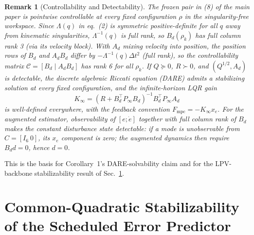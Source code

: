 \documentclass[journal]{IEEEtran}
\newtheorem{remark}{Remark}
\newcommand{\Laminv}{\Lambda^{-1}(q)}
\newcommand{\Fmpc}{F_{\text{mpc}}}
\begin{document}
\begin{remark}[Controllability and Detectability]\label{rem:feasibility}
The frozen pair in (8) of the main paper is pointwise controllable at every
fixed configuration $\rho$ in the singularity-free workspace. Since
$\Lambda(q)$ in eq.~(2) is symmetric positive-definite for all $q$ away
from kinematic singularities, $\Laminv$ is full rank, so $B_d(\rho_k)$
has full column rank 3 (via its velocity block). With $A_d$ mixing
velocity into position, the position rows of $B_d$ and $A_dB_d$ differ
by $-\Laminv\Delta t^2$ (full rank), so the controllability matrix
$\mathcal C=[B_d\mid A_dB_d]$ has rank 6 for all $\rho_k$. If
$Q\succeq0$, $R\succ0$, and $(Q^{1/2},A_d)$ is detectable, the discrete
algebraic Riccati equation (DARE) admits a stabilizing solution at every
fixed configuration, and the infinite-horizon LQR gain
\begin{equation*}
K_\infty=(R+B_d^\top P_\infty B_d)^{-1}B_d^\top P_\infty A_d
\end{equation*}
is well-defined everywhere, with the feedback convention
$\Fmpc=-K_\infty x_e$. For the augmented estimator, observability
of $[e;\dot e]$ together with full column rank of $B_d$ makes the
constant disturbance state detectable: if a mode is unobservable from
$C=[I_6\ 0]$, its $x_e$ component is zero; the augmented dynamics then
require $B_dd=0$, hence $d=0$.
\end{remark}

This is the basis for Corollary~1's DARE-solvability claim and for the
LPV-backbone stabilizability result of Sec.~\ref{sec:stab}.

\section{Common-Quadratic Stabilizability of the Scheduled Error Predictor}\label{sec:stab}
\end{document}
